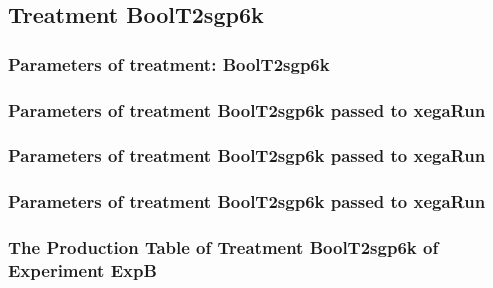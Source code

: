 \documentclass[18pt,c]{beamer}
\makeatletter
\def\beamer@writeslidentry@miniframesoff{%
  \expandafter\beamer@ifempty\expandafter{\beamer@framestartpage}{}%
  {%
   \clearpage\beamer@notesactions%
  }
}
\newcommand*{\miniframesoff}{\let\beamer@writeslidentry=\beamer@writeslidentry@miniframesoff}
\makeatother
\begin{document}
\miniframesoff
\subsection{Treatment BoolT2sgp6k}

 \begin{frame}
 \fontsize{8pt}{9pt}\selectfont
 \frametitle{  Parameters of treatment: BoolT2sgp6k 
 }

 \label{ExpBtParmTable056.tex}  
 \end{frame}


 \begin{frame}
 \fontsize{8pt}{9pt}\selectfont
 \frametitle{  Parameters of treatment BoolT2sgp6k passed to xegaRun
 }

 \label{ExpBtParmTable057.tex}  
 \end{frame}


 \begin{frame}
 \fontsize{8pt}{9pt}\selectfont
 \frametitle{  Parameters of treatment BoolT2sgp6k passed to xegaRun
 }

 \label{ExpBtParmTable058.tex}  
 \end{frame}


 \begin{frame}
 \fontsize{8pt}{9pt}\selectfont
 \frametitle{  Parameters of treatment BoolT2sgp6k passed to xegaRun
 }

 \label{ExpBtParmTable059.tex}  
 \end{frame}

 \begin{frame}
 \fontsize{8pt}{9pt}\selectfont
 \frametitle{ The Production Table of Treatment BoolT2sgp6k of Experiment ExpB }

 \label{ExpBGrammarTable016.tex}  
 \end{frame}
\end{document}
